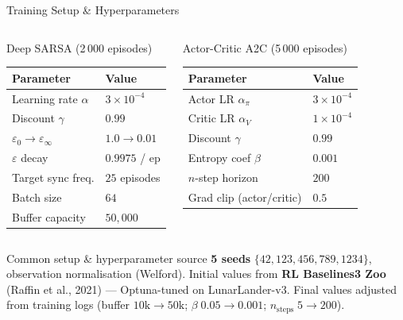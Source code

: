 \documentclass[aspectratio=169, 10pt]{beamer}
\begin{document}
\begin{frame}{Training Setup \& Hyperparameters}
  \begin{columns}[T]
      \begin{block}{Deep SARSA \small(2\,000 episodes)}
        \vspace{0.2em}
        \small
        \begin{tabular}{ll}
          \toprule
          \textbf{Parameter} & \textbf{Value} \\
          \midrule
          Learning rate $\alpha$   & $3\times 10^{-4}$ \\
          Discount $\gamma$        & $0.99$ \\
          $\varepsilon_0 \to \varepsilon_\infty$ & $1.0 \to 0.01$ \\
          $\varepsilon$ decay      & $0.9975$ / ep\\
          Target sync freq.        & $25$ episodes \\
          Batch size               & $64$ \\
          Buffer capacity          & $50{,}000$ \\
          \bottomrule
        \end{tabular}
      \end{block}
      \begin{block}{Actor-Critic A2C \small(5\,000 episodes)}
        \vspace{0.2em}
        \small
        \begin{tabular}{ll}
          \toprule
          \textbf{Parameter} & \textbf{Value}\\
          \midrule
          Actor LR $\alpha_\pi$    & $3\times 10^{-4}$ \\
          Critic LR $\alpha_V$     & $1\times 10^{-4}$ \\
          Discount $\gamma$        & $0.99$ \\
          Entropy coef $\beta$     & $0.001$ \\
          $n$-step horizon         & $200$ \\
          Grad clip (actor/critic) & $0.5$ \\
          \bottomrule
        \end{tabular}
      \end{block}
  \end{columns}
  \vspace{0.3em}
  \begin{block}{Common setup \& hyperparameter source}
    \textbf{5 seeds} $\{42, 123, 456, 789, 1234\}$, observation normalisation (Welford).
    Initial values from \textbf{RL Baselines3 Zoo} (Raffin et al., 2021) --- Optuna-tuned
    on LunarLander-v3. Final values adjusted from training logs
    (buffer $10\text{k}{\to}50\text{k}$; $\beta\;0.05{\to}0.001$; $n_\text{steps}\;5{\to}200$).
  \end{block}
\end{frame}
\end{document}
